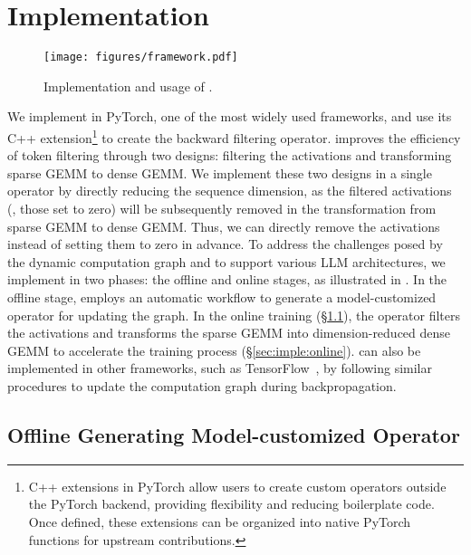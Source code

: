 \section{Implementation}

\begin{figure}[t]
	\centering
	\texttt{[image: figures/framework.pdf]}
	\caption{Implementation and usage of \solution.} 
	\label{fig:framework}
\end{figure}

We implement \solution in PyTorch, one of the most widely used frameworks, and use its C++ extension\footnote{C++ extensions in PyTorch allow users to create custom operators outside the PyTorch backend, providing flexibility and reducing boilerplate code. Once defined, these extensions can be organized into native PyTorch functions for upstream contributions.} to create the backward filtering operator. \solution improves the efficiency of token filtering through two designs: filtering the activations and transforming sparse GEMM to dense GEMM. We implement these two designs in a single operator by directly reducing the sequence dimension, as the filtered activations (\ie, those set to zero) will be subsequently removed in the transformation from sparse GEMM to dense GEMM. Thus, we can directly remove the activations instead of setting them to zero in advance.
To address the challenges posed by the dynamic computation graph and to support various LLM architectures, we implement \solution in two phases: the offline and online stages, as illustrated in . In the offline stage, \solution employs an automatic workflow to generate a model-customized operator for updating the graph. In the online training (\S\ref{sec:imple:offline}), the operator filters the activations and transforms the sparse GEMM into dimension-reduced dense GEMM to accelerate the training process (\S\ref{sec:imple:online}).
\solution can also be implemented in other frameworks, such as TensorFlow~\cite{TensorFlow}, by following similar procedures to update the computation graph during backpropagation.

\subsection{Offline Generating Model-customized Operator} \label{sec:imple:offline}

